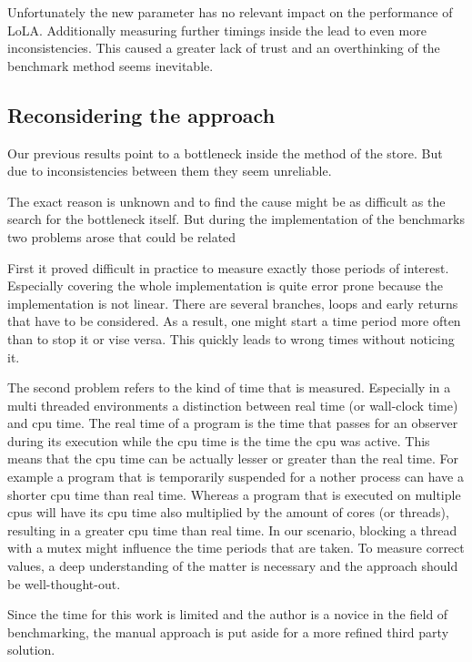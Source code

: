 Unfortunately the new parameter has no relevant impact on the performance of LoLA. Additionally measuring further timings inside the  lead to even more inconsistencies. This caused a greater lack of trust and an overthinking of the benchmark method seems inevitable.

\subsection{Reconsidering the approach}
Our previous results point to a bottleneck inside the  method of the store. But due to inconsistencies between them they seem unreliable.

The exact reason is unknown and to find the cause might be as difficult as the search for the bottleneck itself. But during the implementation of the benchmarks two problems arose that could be related

First it proved difficult in practice to measure exactly those periods of interest. Especially covering the whole implementation is quite error prone because the implementation is not linear. There are several branches, loops and early returns that have to be considered. As a result, one might start a time period more often than to stop it or vise versa. This quickly leads to wrong times without noticing it.

The second problem refers to the kind of time that is measured. Especially in a multi threaded environments a distinction between real time (or wall-clock time) and cpu time. The real time of a program is the time that passes for an observer during its execution while the cpu time is the time the cpu was active. This means that the cpu time can be actually lesser or greater than the real time. For example a program that is temporarily suspended for a nother process can have a shorter cpu time than real time. Whereas a program that is executed on multiple cpus will have its cpu time also multiplied by the amount of cores (or threads), resulting in a greater cpu time than real time. In our scenario, blocking a thread with a mutex might influence the time periods that are taken. To measure correct values, a deep understanding of the matter is necessary and the approach should be well-thought-out.

Since the time for this work is limited and the author is a novice in the field of benchmarking, the manual approach is put aside for a more refined third party solution.

